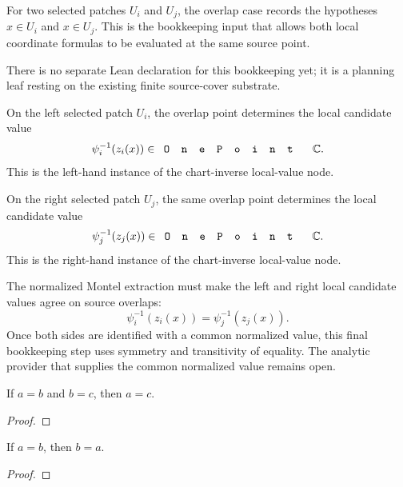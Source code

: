 \begin{lemma}
\label{lem:montel-selector-source-overlap-membership}
For two selected patches \(U_i\) and \(U_j\), the overlap case records the
hypotheses \(x\in U_i\) and \(x\in U_j\).  This is the bookkeeping input that
allows both local coordinate formulas to be evaluated at the same source point.

There is no separate Lean declaration for this bookkeeping yet; it is a
planning leaf resting on the existing finite source-cover substrate.
\end{lemma}

\begin{lemma}
\label{lem:montel-selector-left-overlap-local-candidate}
On the left selected patch \(U_i\), the overlap point determines the local
candidate value
\[
  \psi_i^{-1}(z_i(x)) \in \code{OnePoint}\,\C.
\]
This is the left-hand instance of the chart-inverse local-value node.
\end{lemma}

\begin{lemma}
\label{lem:montel-selector-right-overlap-local-candidate}
On the right selected patch \(U_j\), the same overlap point determines the local
candidate value
\[
  \psi_j^{-1}(z_j(x)) \in \code{OnePoint}\,\C.
\]
This is the right-hand instance of the chart-inverse local-value node.
\end{lemma}

\begin{lemma}
\label{lem:montel-selector-normalized-transition-agreement}
The normalized Montel extraction must make the left and right local candidate
values agree on source overlaps:
\[
  \psi_i^{-1}(z_i(x))=\psi_j^{-1}(z_j(x)).
\]
Once both sides are identified with a common normalized value, this final
bookkeeping step uses symmetry and transitivity of equality.  The analytic
provider that supplies the common normalized value remains open.
\end{lemma}

\begin{lemma}
\label{lem:mathlib-eq-trans}
If \(a=b\) and \(b=c\), then \(a=c\).
\leanok
\end{lemma}
\begin{proof}\leanok\end{proof}

\begin{lemma}
\label{lem:mathlib-eq-symm}
If \(a=b\), then \(b=a\).
\leanok
\end{lemma}
\begin{proof}\leanok\end{proof}
